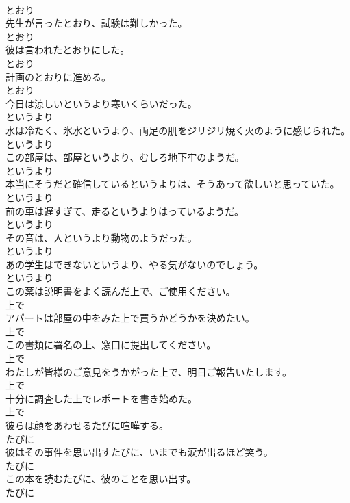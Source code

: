 \documentclass[8pt]{extreport}
\begin{document}
\begin{CJK}{UTF8}{min}
\\	とおり
\\	先生が言ったとおり、試験は難しかった。	
\\	とおり
\\	彼は言われたとおりにした。	
\\	とおり
\\	計画のとおりに進める。	
\\	とおり
\\	今日は涼しいというより寒いくらいだった。	
\\	というより
\\	水は冷たく、氷水というより、両足の肌をジリジリ焼く火のように感じられた。	
\\	というより
\\	この部屋は、部屋というより、むしろ地下牢のようだ。	
\\	というより
\\	本当にそうだと確信しているというよりは、そうあって欲しいと思っていた。	
\\	というより
\\	前の車は遅すぎて、走るというよりはっているようだ。	
\\	というより
\\	その音は、人というより動物のようだった。	
\\	というより
\\	あの学生はできないというより、やる気がないのでしょう。	
\\	というより
\\	この薬は説明書をよく読んだ上で、ご使用ください。	
\\	上で
\\	アパートは部屋の中をみた上で買うかどうかを決めたい。	
\\	上で
\\	この書類に署名の上、窓口に提出してください。	
\\	上で
\\	わたしが皆様のご意見をうかがった上で、明日ご報告いたします。	
\\	上で
\\	十分に調査した上でレポートを書き始めた。	
\\	上で
\\	彼らは顔をあわせるたびに喧嘩する。	
\\	たびに
\\	彼はその事件を思い出すたびに、いまでも涙が出るほど笑う。	
\\	たびに
\\	この本を読むたびに、彼のことを思い出す。	
\\	たびに

\end{CJK}
\end{document}
